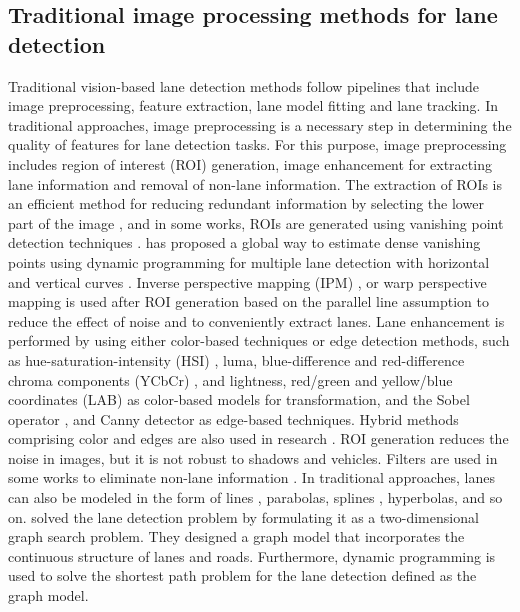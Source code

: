 \documentclass[journal]{IEEEtran}
\begin{document}
\subsection{Traditional image processing methods for lane detection}
Traditional vision-based lane detection methods follow pipelines that include image preprocessing, feature extraction, lane model fitting and lane tracking. In traditional approaches, image preprocessing is a necessary step in determining the quality of features for lane detection tasks. For this purpose, image preprocessing includes region of interest (ROI) generation, image enhancement for extracting lane information and removal of non-lane information. The extraction of ROIs is an efficient method for reducing redundant information by selecting the lower part of the image \cite{Wu2014} \cite{Deng2013} \cite{Caceres2016}, and in some works, ROIs are generated using vanishing point detection techniques \cite{Son2015} \cite{Lee2018} \cite{Xu2016}. \cite{umar2017} has proposed a global way to estimate dense vanishing points using dynamic programming for multiple lane detection with horizontal and vertical curves .
Inverse perspective mapping (IPM) \cite{Du2016},\cite{Jung2015} or warp perspective mapping \cite{Shin2015} is used after ROI generation based on the parallel line assumption to reduce the effect of noise and to conveniently extract lanes. Lane enhancement is performed by using either color-based techniques or edge detection methods, such as hue-saturation-intensity (HSI) \cite{Sun2006}, luma, blue-difference and red-difference chroma components (YCbCr) \cite{Son2015}, and lightness, red/green and yellow/blue coordinates (LAB) \cite{Ma2010} as color-based models for transformation, and the Sobel operator \cite{De2015},\cite{Wang2012} and Canny detector \cite{Yoo2013} \cite{Niu2016} as edge-based techniques. Hybrid methods comprising color and edges are also used in research \cite{Caceres2016}. ROI generation reduces the noise in images, but it is not robust to shadows and vehicles. Filters are used in some works to eliminate non-lane information \cite{Nan2016} \cite{An2013} \cite{Wu2014}. In traditional approaches, lanes can also be modeled in the form of lines\cite{Liang2017} \cite{Nan2016}, parabolas\cite{S2015}\cite{Wang2012}, splines\cite{Nan2016}\cite{Wang2004} \cite{Kim2008}, hyperbolas\cite{Xu2016}, and so on. \cite{jiao2019} solved the lane detection problem by formulating it as a two-dimensional graph search problem. They designed a graph model that incorporates the continuous structure of lanes and roads. Furthermore, dynamic programming is used to solve the shortest path problem for the lane detection defined as the graph model.
\end{document}
